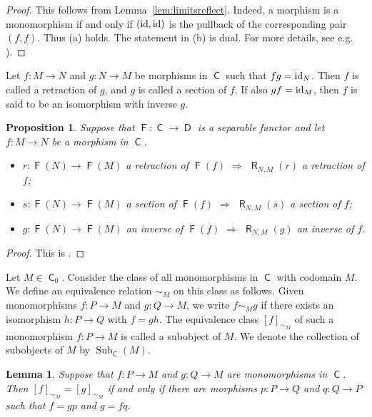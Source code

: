 \documentclass[12pt]{amsart}
\newtheorem{prop}[thm]{Proposition}
\newtheorem{lem}[thm]{Lemma}
\theoremstyle{definition}
\newcommand{\id}{{\rm id}}
\DeclareMathOperator{\C}{\mathsf C}
\DeclareMathOperator{\D}{\mathsf D}
\DeclareMathOperator{\Sub}{Sub}
\DeclareMathOperator{\F}{\mathsf F}
\DeclareMathOperator{\R}{\mathsf R}
\begin{document}
\begin{proof}
This follows from Lemma~\ref{lem:limitsreflect}.
Indeed, a morphism is a monomorphism if and only if 
$(\id,\id)$ is the pullback of the corresponding pair $(f,f)$.
Thus (a) holds. The statement in (b) is dual.
For more details, see e.g. 
\cite[p. 72, Exercise 4]{maclane1998}).
\end{proof}

Let $f : M \to N$ and $g : N \to M$ be morphisms 
in $\C$ such that
$fg = \id_N$.  Then $f$ is called 
a retraction of $g$, and
$g$ is called a section of $f$. 
If also $gf = \id_M$, 
then $f$ is said to be an isomorphism 
with inverse $g$. 

\begin{prop}\label{prop:retractionsection}
Suppose that $\F : \C \to \D$ is a separable
functor and let $f : M \to N$ be a morphism in $\C$.
\begin{itemize}[widest=(a)]

\item[{\rm (a)}] $r : \F(N) \to \F(M)$
a retraction of $\F(f)$ $\Longrightarrow$
$\R_{N,M}(r)$ a retraction of $f$;

\item[{\rm (b)}] $s : \F(N) \to \F(M)$  
a section of $\F(f)$ $\Longrightarrow$ 
$\R_{N,M}(s)$ a section of $f$;

\item[{\rm (c)}] $g : \F(N) \to \F(M)$ 
an inverse of $\F(f)$
$\Longrightarrow$ $\R_{N,M}(g)$ an inverse of $f$.

\end{itemize}
\end{prop}

\begin{proof}
This is \cite[Prop. 1.2.1]{nastasescu1989}.
\end{proof}

Let $M \in \C_0$. 
Consider the class of all monomorphisms
in $\C$ with codomain $M$.  
We define an equivalence relation $\sim_M$ on this 
class as follows.
Given monomorphisms $f : P \to M$ and $g : Q \to M$, 
we write $f \sim_M g$ if there exists an isomorphism $h : P \to Q$ with $f = g h$.
The equivalence class $[f]_{\sim_M}$ 
of such a 
monomorphism $f : P \to M$ is called a 
subobject of $M$.  
We denote the collection of subobjects of $M$ by 
$\Sub_{\C}(M)$.

\begin{lem}\label{lem:simequiv}
Suppose that $f : P \to M$ and $g : Q \to M$ are 
monomorphisms in $\C$. Then $[f]_{\sim_M} = 
[g]_{\sim_M}$ if and only if there are 
morphisms $p : P \to Q$ and $q : Q \to P$
such that $f = gp$ and $g = f q$.
\end{lem}
\end{document}
